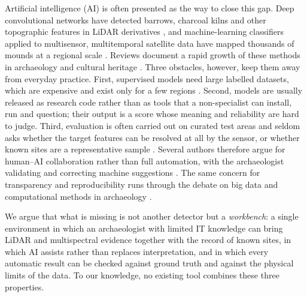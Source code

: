 \documentclass[preprint,12pt,authoryear]{elsarticle}
\begin{document}
Artificial intelligence (AI) is often presented as the way to close this gap. Deep convolutional networks have detected barrows, charcoal kilns and other topographic features in LiDAR derivatives \citep{verschoof2019rcnn,trier2019arran,somrak2020maya}, and machine-learning classifiers applied to multisensor, multitemporal satellite data have mapped thousands of mounds at a regional scale \citep{orengo2020mounds}. Reviews document a rapid growth of these methods in archaeology and cultural heritage \citep{davis2019obia,fiorucci2020mlch,bickler2021ml}. Three obstacles, however, keep them away from everyday practice. First, supervised models need large labelled datasets, which are expensive and exist only for a few regions \citep{kokalj2023mlready}. Second, models are usually released as research code rather than as tools that a non-specialist can install, run and question; their output is a score whose meaning and reliability are hard to judge. Third, evaluation is often carried out on curated test areas and seldom asks whether the target features can be resolved at all by the sensor, or whether known sites are a representative sample \citep{opitz2018trends,fontana2024sampling}. Several authors therefore argue for human--AI collaboration rather than full automation, with the archaeologist validating and correcting machine suggestions \citep{lambers2019citizen,doneus2022hitl,casini2023humanai}. The same concern for transparency and reproducibility runs through the debate on big data and computational methods in archaeology \citep{huggett2020bigdata,marwick2017reproducibility}.

We argue that what is missing is not another detector but a \emph{workbench}: a single environment in which an archaeologist with limited IT knowledge can bring LiDAR and multispectral evidence together with the record of known sites, in which AI assists rather than replaces interpretation, and in which every automatic result can be checked against ground truth and against the physical limits of the data. To our knowledge, no existing tool combines these three properties.
\end{document}
